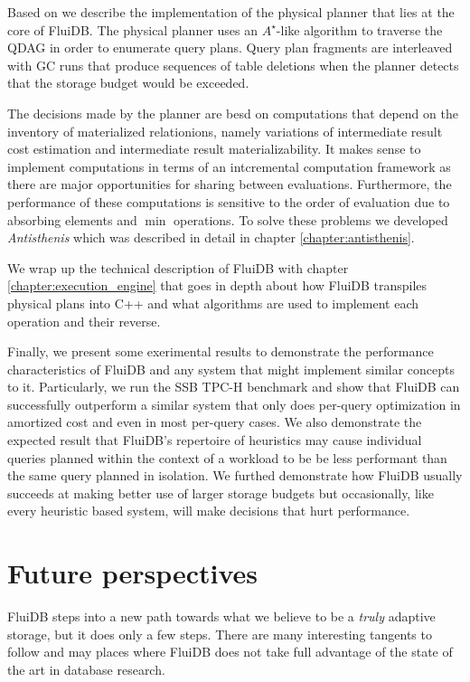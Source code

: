 Based on  we describe the implementation of the physical
planner that lies at the core of FluiDB. The physical planner uses an
\(A^{\star}\)-like algorithm to traverse the QDAG in order to
enumerate query plans. Query plan fragments are interleaved with GC
runs that produce sequences of table deletions when the planner
detects that the storage budget would be exceeded.

The decisions made by the planner are besd on computations that depend
on the inventory of materialized relationions, namely variations of
intermediate result cost estimation and intermediate result
materializability. It makes sense to implement computations in terms
of an intcremental computation framework as there are major
opportunities for sharing between evaluations. Furthermore, the
performance of these computations is sensitive to the order of
evaluation due to absorbing elements and \(\min\) operations. To solve
these problems we developed \emph{Antisthenis} which was described in
detail in chapter \ref{chapter:antisthenis}.

We wrap up the technical description of FluiDB with chapter
\ref{chapter:execution_engine} that goes in depth about how FluiDB
transpiles physical plans into C++ and what algorithms are used to
implement each operation and their reverse.

Finally, we present some exerimental results to demonstrate the
performance characteristics of FluiDB and any system that might
implement similar concepts to it. Particularly, we run the SSB TPC-H
benchmark and show that FluiDB can successfully outperform a similar
system that only does per-query optimization in amortized cost and
even in most per-query cases. We also demonstrate the expected result
that FluiDB's repertoire of heuristics may cause individual queries
planned within the context of a workload to be be less performant than
the same query planned in isolation. We furthed demonstrate how FluiDB
usually succeeds at making better use of larger storage budgets but
occasionally, like every heuristic based system, will make decisions
that hurt performance.

\section{Future perspectives}

FluiDB steps into a new path towards what we believe to be a
\emph{truly} adaptive storage, but it does only a few steps. There are
many interesting tangents to follow and may places where FluiDB does
not take full advantage of the state of the art in database research.

